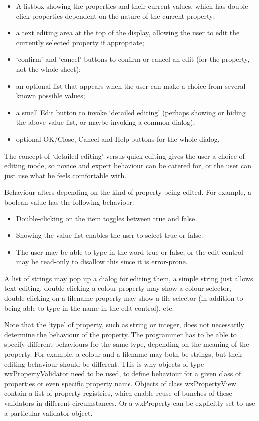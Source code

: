 \begin{itemize}\itemsep=0pt
\item A listbox showing the properties and their current values, which has double-click
properties dependent on the nature of the current property;
\item a text editing area at the top of the display, allowing the user to edit
the currently selected property if appropriate;
\item `confirm' and `cancel' buttons to confirm or cancel an edit (for the property, not the
whole sheet);
\item an optional list that appears when the user can make a choice from several known possible values;
\item a small Edit button to invoke `detailed editing' (perhaps showing or hiding the above value list, or
maybe invoking a common dialog);
\item optional OK/Close, Cancel and Help buttons for the whole dialog.
\end{itemize}

The concept of `detailed editing' versus quick editing gives the user a choice
of editing mode, so novice and expert behaviour can be catered for, or the user can just
use what he feels comfortable with.

Behaviour alters depending on the kind of property being edited. For example, a boolean value has
the following behaviour:

\begin{itemize}\itemsep=0pt
\item Double-clicking on the item toggles between true and false.
\item Showing the value list enables the user to select true or false.
\item The user may be able to type in the word true or false, or the edit control
may be read-only to disallow this since it is error-prone.
\end{itemize}

A list of strings may pop up a dialog for editing them, a simple string just allows text editing,
double-clicking a colour property may show a colour selector, double-clicking on a filename property may
show a file selector (in addition to being able to type in the name in the edit control), etc.

Note that the `type' of property, such as string or integer, does not
necessarily determine the behaviour of the property. The programmer has
to be able to specify different behaviours for the same type, depending
on the meaning of the property. For example, a colour and a filename may
both be strings, but their editing behaviour should be different. This
is why objects of type wxPropertyValidator need to be used, to define
behaviour for a given class of properties or even specific property
name.  Objects of class wxPropertyView contain a list of property
registries, which enable reuse of bunches of these validators in
different circumstances. Or a wxProperty can be explicitly set to use a
particular validator object. 

